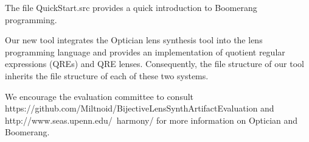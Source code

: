 \documentclass[acmsmall,review,anonymous]{acmart}
\begin{document}
The file QuickStart.src provides a quick introduction to Boomerang programming.

Our new tool integrates the Optician lens synthesis tool \cite{optician} into
the lens programming language \cite{boomerang} and provides an implementation of
quotient regular expressions (QREs) and QRE lenses. Consequently, the file
structure of our tool inherits the file structure of each of these two systems.

We encourage the evaluation committee to consult\\
https://github.com/Miltnoid/BijectiveLensSynthArtifactEvaluation and
\\http://www.seas.upenn.edu/~harmony/ for more information on Optician and
Boomerang.


\end{document}
